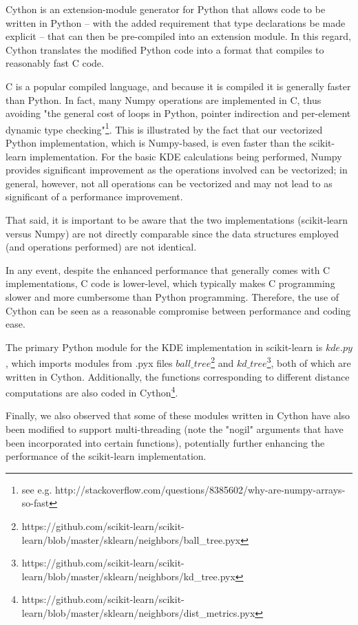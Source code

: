 \documentclass[11pt]{article}
\begin{document}
Cython is an extension-module generator for Python that allows code to be written in Python -- with the added requirement that type declarations be made explicit -- that can then be pre-compiled into an extension module. In this regard, Cython translates the modified Python code into a format that compiles to reasonably fast C code.  \medskip

\noindent C is a popular compiled language, and because it is compiled it is generally faster than Python. In fact, many Numpy operations are implemented in C, thus avoiding "the general cost of loops in Python, pointer indirection and per-element dynamic type checking"\footnote{see e.g. http://stackoverflow.com/questions/8385602/why-are-numpy-arrays-so-fast}. This is illustrated by the fact that our vectorized Python implementation, which is Numpy-based, is even faster than the scikit-learn implementation. For the basic KDE calculations being performed, Numpy provides significant improvement as the operations involved can be vectorized; in general, however, not all operations can be vectorized and may not lead to as significant of a performance improvement. \medskip

\noindent That said, it is important to be aware that the two implementations (scikit-learn versus Numpy) are not directly comparable since the data structures employed (and operations performed) are not identical. \medskip

\noindent In any event, despite the enhanced performance that generally comes with C implementations, C code is lower-level, which typically makes C programming slower and more cumbersome than Python programming. Therefore, the use of Cython can be seen as a reasonable compromise between performance and coding ease. \medskip

\noindent The primary Python module for the KDE implementation in scikit-learn is $kde.py$, which imports modules from .pyx files $ball\_tree$\footnote{https://github.com/scikit-learn/scikit-learn/blob/master/sklearn/neighbors/ball\_tree.pyx} and $kd\_tree$\footnote{https://github.com/scikit-learn/scikit-learn/blob/master/sklearn/neighbors/kd\_tree.pyx}, both of which are written in Cython. Additionally, the functions corresponding to different distance computations are also coded in Cython\footnote{https://github.com/scikit-learn/scikit-learn/blob/master/sklearn/neighbors/dist\_metrics.pyx}. \medskip

\noindent Finally, we also observed that some of these modules written in Cython have also been modified to support multi-threading (note the "nogil" arguments that have been incorporated into certain functions), potentially further enhancing the performance of the scikit-learn implementation.
\end{document}
